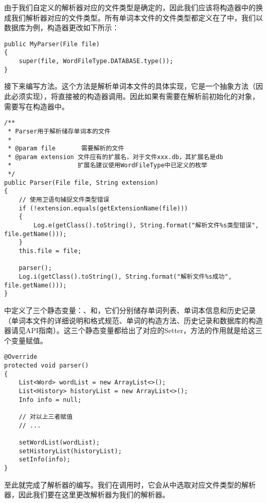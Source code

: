由于我们自定义的解析器对应的文件类型是确定的，因此我们应该将构造器中的换成我们解析器对应的文件类型。所有单词本文件的文件类型都定义在了中，我们以数据库为例，构造器更改如下所示：

\begin{lstlisting}[style=Java, caption={构造器},label={lst:Parser构造器}]
public MyParser(File file)
{
    super(file, WordFileType.DATABASE.type());
}
\end{lstlisting}

接下来编写方法。这个方法是解析单词本文件的具体实现，它是一个抽象方法（因此必须实现），将直接被的构造器调用。因此如果有需要在解析前初始化的对象，需要写在构造器中。

\begin{lstlisting}[style=Java, caption={Parser的构造器源码},label={lst:Parser的构造器源码}]
/**
 * Parser用于解析储存单词本的文件
 *
 * @param file       需要解析的文件
 * @param extension 文件应有的扩展名，对于文件xxx.db，其扩展名是db
 *                  扩展名建议使用WordFileType中已定义的枚举
 */
public Parser(File file, String extension)
{
    // 使用卫语句捕捉文件类型错误
    if (!extension.equals(getExtensionName(file)))
    {
        Log.e(getClass().toString(), String.format("解析文件%s类型错误", file.getName()));
    }
    this.file = file;

    parser();
    Log.i(getClass().toString(), String.format("解析文件%s成功", file.getName()));
}
\end{lstlisting}

中定义了三个静态变量：、和，它们分别储存单词列表、单词本信息和历史记录（单词本文件的详细说明和格式规范、单词的构造方法、历史记录和数据库的构造器请见API指南）。这三个静态变量都给出了对应的Setter，方法的作用就是给这三个变量赋值。

\begin{lstlisting}[style=Java, caption={parser方法},label={lst:parser方法}]
@Override
protected void parser()
{
    List<Word> wordList = new ArrayList<>();
    List<History> historyList = new ArrayList<>();
    Info info = null;

    // 对以上三者赋值
    // ...

    setWordList(wordList);
    setHistoryList(historyList);
    setInfo(info);
}
\end{lstlisting}

至此就完成了解析器的编写。我们在调用时，它会从中选取对应文件类型的解析器，因此我们要在这里更改解析器为我们的解析器。

